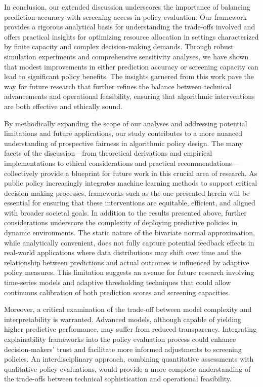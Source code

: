 \documentclass{article} %
\begin{document}
In conclusion, our extended discussion underscores the importance of balancing prediction accuracy with screening access in policy evaluation. Our framework provides a rigorous analytical basis for understanding the trade-offs involved and offers practical insights for optimizing resource allocation in settings characterized by finite capacity and complex decision-making demands. Through robust simulation experiments and comprehensive sensitivity analyses, we have shown that modest improvements in either prediction accuracy or screening capacity can lead to significant policy benefits. The insights garnered from this work pave the way for future research that further refines the balance between technical advancements and operational feasibility, ensuring that algorithmic interventions are both effective and ethically sound.

By methodically expanding the scope of our analyses and addressing potential limitations and future applications, our study contributes to a more nuanced understanding of prospective fairness in algorithmic policy design. The many facets of the discussion—from theoretical derivations and empirical implementations to ethical considerations and practical recommendations—collectively provide a blueprint for future work in this crucial area of research. As public policy increasingly integrates machine learning methods to support critical decision-making processes, frameworks such as the one presented herein will be essential for ensuring that these interventions are equitable, efficient, and aligned with broader societal goals.
In addition to the results presented above, further considerations underscore the complexity of deploying predictive policies in dynamic environments. The static nature of the bivariate normal approximation, while analytically convenient, does not fully capture potential feedback effects in real-world applications where data distributions may shift over time and the relationship between predictions and actual outcomes is influenced by adaptive policy measures. This limitation suggests an avenue for future research involving time-series models and adaptive thresholding techniques that could allow continuous calibration of both prediction scores and screening capacities.

Moreover, a critical examination of the trade-off between model complexity and interpretability is warranted. Advanced models, although capable of yielding higher predictive performance, may suffer from reduced transparency. Integrating explainability frameworks into the policy evaluation process could enhance decision-makers’ trust and facilitate more informed adjustments to screening policies. An interdisciplinary approach, combining quantitative assessments with qualitative policy evaluations, would provide a more complete understanding of the trade-offs between technical sophistication and operational feasibility.
\end{document}
